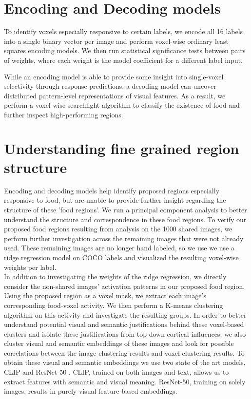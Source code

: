 \documentclass[../thesis.tex]{subfiles}
\begin{document}
\section{Encoding and Decoding models}
To identify voxels especially responsive to certain labels, we encode all 16 labels into a single binary vector per image and perform voxel-wise ordinary least squares encoding models. We then run statistical significance tests between pairs of weights, where each weight is the model coefficient for a different label input. 

While an encoding model is able to provide some insight into single-voxel selectivity through response predictions, a decoding model can uncover distributed pattern-level representations of visual features. As a result, we perform a voxel-wise searchlight algorithm to classify the existence of food and further inspect high-performing regions. 

\section{Understanding fine grained region structure}
Encoding and decoding models help identify proposed regions especially responsive to food, but are unable to provide further insight regarding the structure of these 'food regions'. We run a principal component analysis to better understand the structure and correspondence in these food regions. To verify our proposed food regions resulting from analysis on the 1000 shared images, we perform further investigation across the remaining images that were not already used. These remaining images are no longer hand labeled, so we use we use a ridge regression model on COCO labels and visualized the resulting voxel-wise weights per label. \\

In addition to investigating the weights of the ridge regression, we directly consider the non-shared images' activation patterns in our proposed food region. Using the proposed region as a voxel mask, we extract each image's corresponding food-voxel activity. We then perform a K-means clustering algorithm on this activity and investigate the resulting groups. In order to better understand potential visual and semantic justifications behind these voxel-based clusters and isolate these justifications from top-down cortical influences, we also cluster visual and semantic embeddings of these images and look for possible correlations between the image clustering results and voxel clustering results. To obtain these visual and semantic embeddings we use two state of the art models, CLIP and ResNet-50 \cite{radford2021learning, he2016deep}. CLIP, trained on both images and text, allows us to extract features with semantic and visual meaning. ResNet-50, training on solely images, results in purely visual feature-based embeddings. 
\end{document}
